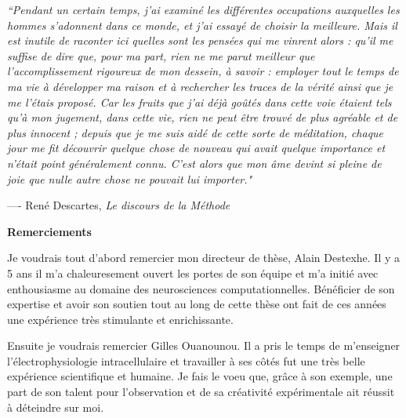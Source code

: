 \documentclass[11pt]{book}
\title{}
\date{}
\author{}
\begin{document}
\thispagestyle{empty}

\vspace*{5cm}

\textit{``Pendant un certain temps, j'ai examin\'e les diff\'erentes
occupations auxquelles les hommes s'adonnent dans ce monde, et j'ai
essay\'e de choisir la meilleure. Mais il est inutile de raconter ici
quelles sont les pens\'ees qui me vinrent alors : qu'il me suffise de
dire que, pour ma part, rien ne me parut meilleur que
l'accomplissement rigoureux de mon dessein, \`a savoir : employer tout
le temps de ma vie \`a d\'evelopper ma raison et \`a rechercher les
traces de la v\'erit\'e ainsi que je me l'\'etais propos\'e. Car les
fruits que j'ai d\'ej\`a go\^ut\'es dans cette voie \'etaient tels
qu'\`a mon jugement, dans cette vie, rien ne peut \^etre trouv\'e de
plus agr\'eable et de plus innocent ; depuis que je me suis aid\'e de
cette sorte de m\'editation, chaque jour me fit d\'ecouvrir quelque
chose de nouveau qui avait quelque importance et n'\'etait point
g\'en\'eralement connu. C'est alors que mon \^ame devint si pleine de
joie que nulle autre chose ne pouvait lui importer."}

\vspace*{1cm}

\hspace{4cm} ---- Ren\'e Descartes, \textit{Le discours de la M\'ethode}

\newpage

\thispagestyle{empty}
\quad 
\newpage


\thispagestyle{empty}

\huge \textbf{Remerciements} \normalsize
\vspace*{.5cm}

Je voudrais tout d'abord remercier mon directeur de thèse, Alain
Destexhe. Il y a 5 ans il m'a chaleuresement ouvert les portes de son
équipe et m'a initié avec enthousiasme au domaine des neurosciences
computationnelles. Bénéficier de son expertise et avoir son soutien
tout au long de cette thèse ont fait de ces années une expérience très
stimulante et enrichissante.

Ensuite je voudrais remercier Gilles Ouanounou. Il a pris le temps de
m'enseigner l'électrophysiologie intracellulaire et travailler à ses
côtés fut une très belle expérience scientifique et humaine. Je fais
le voeu que, grâce à son exemple, une part de son talent pour
l'observation et de sa créativité expérimentale ait réussit à
déteindre sur moi.
\end{document}
